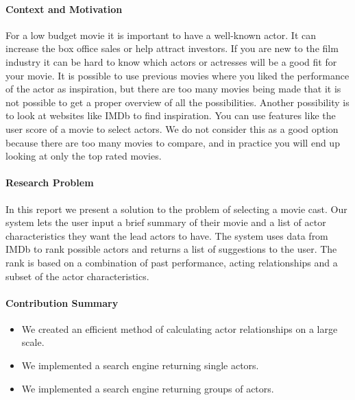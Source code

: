 
\noindent

\paragraph{Context and Motivation}
For a low budget movie it is important to have a well-known actor. It can increase the box office sales or help attract investors\cite{StephenFollows}.
If you are new to the film industry it can be hard to know which actors or actresses will be a good fit for your movie.
It is possible to use previous movies where you liked the performance of the actor as inspiration, but there are too many movies
being made that it is not possible to get a proper overview of all the possibilities. Another possibility is to look at websites like
IMDb\cite{IMDb} to find inspiration. You can use features like the user score of a movie to select actors. We do not consider this
as a good option because there are too many movies to compare, and in practice you will end up looking at only the top rated movies.

\paragraph{Research Problem}
In this report we present a solution to the problem of selecting a movie cast. Our system lets the user input a brief summary of their
movie and a list of actor characteristics they want the lead actors to have. The system uses data from IMDb to rank possible actors
and returns a list of suggestions to the user. The rank is based on a combination of past performance, acting relationships and
a subset of the actor characteristics. 

\paragraph{Contribution Summary}
\begin{itemize}
\item We created an efficient method of calculating actor relationships on a large scale.
\item We implemented a search engine returning single actors.
\item We implemented a search engine returning groups of actors.
\end{itemize}